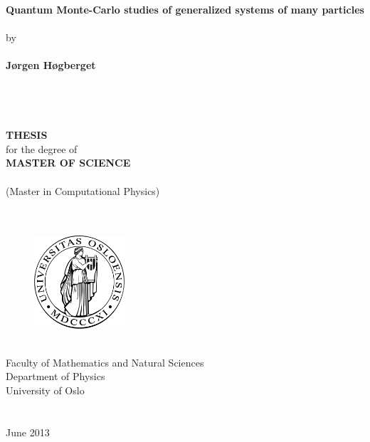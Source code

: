 \begin{titlepage}
\begin{center}
\ \\
\ \\
\ \\
{\huge \bf Quantum Monte-Carlo studies of generalized systems of many particles}\\ 
\ \\ 
{\Large by}\\
\ \\
{\Large \bf J\o{}rgen H\o{}gberget}\\
\ \\
\ \\
\ \\
\ \\
{\large \bf THESIS}\\
{\large for the degree of}\\
{\large \bf MASTER OF SCIENCE}\\
\ \\
(Master in Computational Physics)\\
\ \\
\ \\
\begin{figure}[h!]
\begin{center}
\includegraphics[width=0.3\textwidth]{../Graphics/uiologo.pdf}
\end{center}
\end{figure}
\ \\
\Large{\rm Faculty of Mathematics and Natural Sciences}\\
{\rm Department of Physics}\\
{\rm University of Oslo}\\
\ \\
\ \\
{\rm June 2013}
\end{center}
\end{titlepage}
